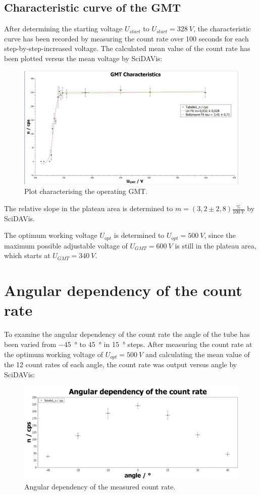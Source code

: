 \subsection{Characteristic curve of the GMT}
%
After determining the starting voltage \(U_{start}\) to \(U_{start}=\SI{328}{V}\), the characteristic curve has been
recorded by measuring the count rate over 100 seconds for each step-by-step-increased voltage. The calculated mean value
of the count rate has been plotted versus the mean voltage by SciDAVis:\par
\begin{figure}[h]
    \centering
    \includegraphics[width=.8\textwidth]{scidavis/Fig.6_GMT-characteristics.jpg}
    \caption[GMT characteristic]{Plot characterising the operating GMT.}
    \label{fig:gmtCharacteristics}
\end{figure}
The relative slope in the plateau area is determined to \(m=(3,2 \pm 2,8) \frac{\%}{\SI{100}{V}}\) by SciDAVis.\par
The optimum working voltage \(U_{opt}\) is determined to \(U_{opt}=\SI{500}{V}\), since the maximum possible adjustable
voltage of \(U_{GMT}=\SI{600}{V}\) is still in the plateau area, which starts at \(U_{GMT}=\SI{340}{V}\).
%
\section{Angular dependency of the count rate}
To examine the angular dependency of the count rate the angle of the tube has been varied from \SI[]{-45}[]{\degree} to
\SI[]{+45}[]{\degree} in \SI[]{15}[]{\degree} steps. After measuring the count rate at the optimum working voltage of
\(U_{opt}=\SI{500}{V}\) and calculating the mean value of the 12 count rates of each angle, the count rate was output
versus angle by SciDAVis:\par
\begin{figure}[h]
    \centering
    \includegraphics[width=.8\textwidth]{scidavis/Fig.7_Angular dependency of the count rate.jpg}
    \caption[Angular dependency of cps]{Angular dependency of the measured count rate.}
    \label{fig:angularDepCPS}
\end{figure}
%
